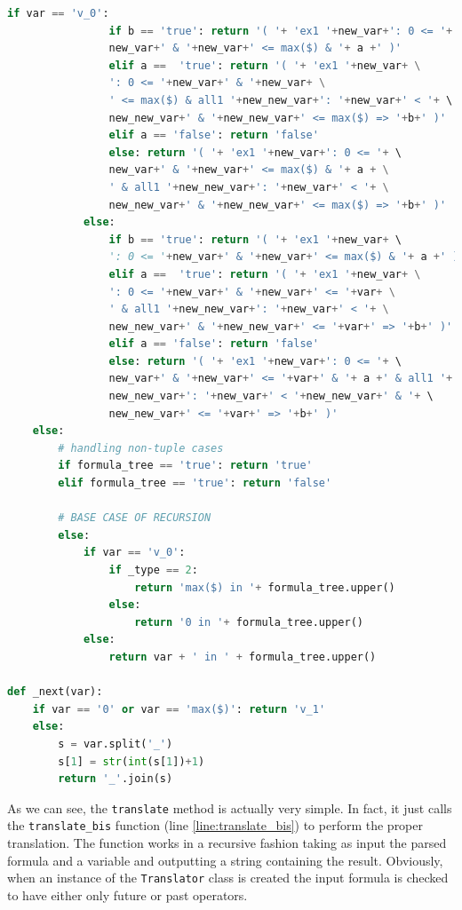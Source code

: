 \begin{lstlisting}[language=Python, style=Python, escapechar = £,  label={code:ltlf2dfa-translate-method}, caption={The \texttt{translate} method.}]
            if var == 'v_0':
                if b == 'true': return '( '+ 'ex1 '+new_var+': 0 <= '+ \ 
                new_var+' & '+new_var+' <= max($) & '+ a +' )'
                elif a ==  'true': return '( '+ 'ex1 '+new_var+ \
                ': 0 <= '+new_var+' & '+new_var+ \
                ' <= max($) & all1 '+new_new_var+': '+new_var+' < '+ \ 
                new_new_var+' & '+new_new_var+' <= max($) => '+b+' )'
                elif a == 'false': return 'false'
                else: return '( '+ 'ex1 '+new_var+': 0 <= '+ \ 
                new_var+' & '+new_var+' <= max($) & '+ a + \
                ' & all1 '+new_new_var+': '+new_var+' < '+ \
                new_new_var+' & '+new_new_var+' <= max($) => '+b+' )'
            else:
                if b == 'true': return '( '+ 'ex1 '+new_var+ \ 
                ': 0 <= '+new_var+' & '+new_var+' <= max($) & '+ a +' )'
                elif a ==  'true': return '( '+ 'ex1 '+new_var+ \
                ': 0 <= '+new_var+' & '+new_var+' <= '+var+ \
                ' & all1 '+new_new_var+': '+new_var+' < '+ \
                new_new_var+' & '+new_new_var+' <= '+var+' => '+b+' )'
                elif a == 'false': return 'false'
                else: return '( '+ 'ex1 '+new_var+': 0 <= '+ \ 
                new_var+' & '+new_var+' <= '+var+' & '+ a +' & all1 '+ \ 
                new_new_var+': '+new_var+' < '+new_new_var+' & '+ \ 
                new_new_var+' <= '+var+' => '+b+' )'
    else:
        # handling non-tuple cases
        if formula_tree == 'true': return 'true'
        elif formula_tree == 'true': return 'false'

        # BASE CASE OF RECURSION
        else:
            if var == 'v_0':
                if _type == 2:
                    return 'max($) in '+ formula_tree.upper()
                else:
                    return '0 in '+ formula_tree.upper()
            else:
                return var + ' in ' + formula_tree.upper()

def _next(var):
    if var == '0' or var == 'max($)': return 'v_1'
    else:
        s = var.split('_')
        s[1] = str(int(s[1])+1)
        return '_'.join(s)
\end{lstlisting}
As we can see, the \texttt{translate} method is actually very simple. In fact, it just calls the \texttt{translate\_bis} function (line \ref{line:translate_bis}) to perform the proper translation. The function works in a recursive fashion taking as input the parsed formula and a variable and outputting a string containing the result. Obviously, when an instance of the \texttt{Translator} class is created the input formula is checked to have either only future or past operators.
